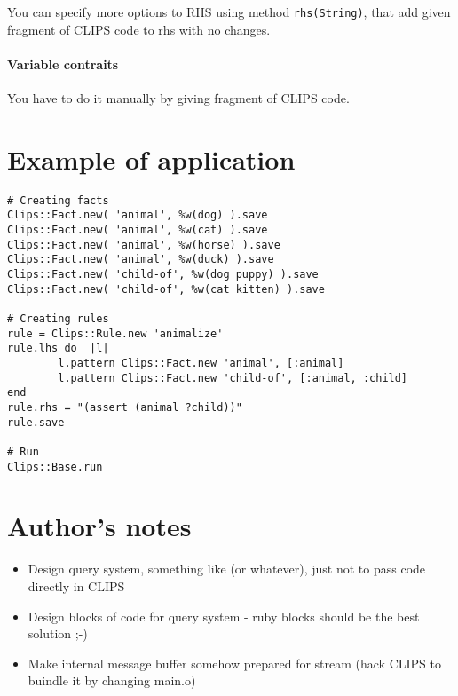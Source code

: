 \documentclass[a4paper,10pt]{article}
\begin{document}
You can specify more options to RHS using method \texttt{rhs(String)}, that add given fragment of CLIPS code to rhs with no changes.

\paragraph{Variable contraits}
You have to do it manually by giving fragment of CLIPS code.

\section{Example of application}
\begin{verbatim}
# Creating facts
Clips::Fact.new( 'animal', %w(dog) ).save
Clips::Fact.new( 'animal', %w(cat) ).save
Clips::Fact.new( 'animal', %w(horse) ).save
Clips::Fact.new( 'animal', %w(duck) ).save
Clips::Fact.new( 'child-of', %w(dog puppy) ).save
Clips::Fact.new( 'child-of', %w(cat kitten) ).save

# Creating rules
rule = Clips::Rule.new 'animalize'
rule.lhs do  |l|
        l.pattern Clips::Fact.new 'animal', [:animal]
        l.pattern Clips::Fact.new 'child-of', [:animal, :child]
end
rule.rhs = "(assert (animal ?child))"
rule.save

# Run
Clips::Base.run\end{verbatim}

\section{Author's notes}
\begin{itemize}
 \item Design query system, something like (or whatever), just not to pass code directly in CLIPS
 \item Design blocks of code for query system - ruby blocks should be the best solution ;-)
 \item Make internal message buffer somehow prepared for stream (hack CLIPS to buindle it by changing main.o)
\end{itemize}
\end{document}
